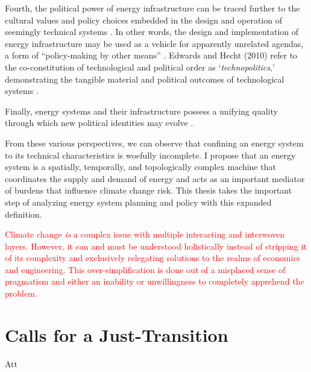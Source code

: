 Fourth, the political power of energy infrastructure can be traced further to
the cultural values and policy choices embedded in the design and operation of
seemingly technical systems \cite{bridge_energy_2018}. In other words, the
design and implementation of energy infrastructure may be used as a vehicle for
apparently unrelated agendas, a form of ``policy-making by other means''
\cite{bridge_energy_2018, clausewitz_chapter_1918}. Edwards and Hecht (2010)
refer to the co-constitution of technological and political order as
`\textit{technopolitics},' demonstrating the tangible material and political
outcomes of technological systems \cite{edwards_history_2010}.

Finally, energy systems and their infrastructure possess a unifying quality
through which new political identities may evolve \cite{bridge_energy_2018}.

From these various perspectives, we can observe that confining an energy system
to its technical characteristics is woefully incomplete. I propose that an
energy system is a spatially, temporally, and topologically complex machine that
coordinates the supply and demand of energy and acts as an important mediator of
burdens that influence climate change risk. This thesis takes the important step
of analyzing energy system planning and policy with this expanded definition.


\textcolor{red}{Climate change \textit{is} a complex issue with multiple
interacting and interwoven layers. However, it can and must be understood
holistically instead of stripping it of its complexity and exclusively
relegating solutions to the realms of economics and engineering. This
over-simplification is done out of a misplaced sense of pragmatism and either an
inability or unwillingness to completely apprehend the problem.}

\noindent\hrulefill




\section{Calls for a Just-Transition}

Att